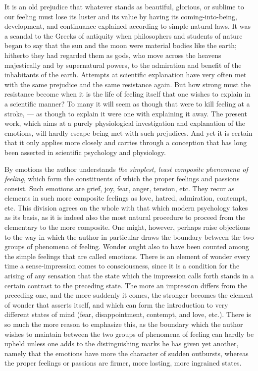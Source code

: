 \documentclass[12pt,a4paper,openany]{book}
\newcommand{\opage}[1]{\marginnote{\footnotesize\textit{[#1]}}}
\begin{document}
It is an old prejudice that whatever stands as beautiful,
glorious, or sublime to our feeling must lose its luster
and its value by having its coming-into-being, development, and
continuance explained according to simple natural laws. It was
a scandal to the Greeks of antiquity when philosophers and
students of nature began to say that the sun and the moon were
material bodies like the earth; hitherto they had regarded
them as gods, who move across the heavens majestically and by
supernatural powers, to the admiration and benefit of the
inhabitants of the earth. Attempts at scientific explanation have very
often met with the same prejudice and the same resistance again.
But how strong must the resistance become when it is
the life of feeling itself that one wishes to explain in a
scientific manner? To many it will seem as though that were to kill
feeling at a stroke, --- as though to explain it were
one with explaining it away. The present work, which
aims at a purely physiological investigation and explanation of
the emotions, will hardly escape being met with such
prejudices. And yet it is certain that it only applies
more closely and carries through a conception that has long been
asserted in scientific psychology and physiology.

By emotions the author understands \emph{the simplest, least
composite phenomena of feeling}, which form the constituents
of which the proper feelings and passions consist.
Such emotions are grief, joy, fear, anger,
tension, etc. They recur as elements in such more
composite feelings as love, hatred, admiration,
\opage{52}contempt, etc. This division agrees on the whole with that
which modern psychology takes as its basis, as it is indeed also
the most natural procedure to proceed from the
elementary to the more composite. One might, however, perhaps raise
objections to the way in which the author in particular
draws the boundary between the two groups of phenomena of feeling.
Wonder ought also to have been counted among the simple feelings that are
called emotions. There is an element of
wonder every time a sense-impression comes to consciousness,
since it is a condition for the arising of any sensation
that the state which the impression calls forth stands in a certain
contrast to the preceding state. The more an impression
differs from the preceding one, and the more suddenly it
comes, the stronger becomes the element of wonder that
asserts itself, and which can form the introduction to very
different states of mind (fear, disappointment, contempt, and
love, etc.). There is so much the more reason to
emphasize this, as the boundary which the author wishes to maintain between the two
groups of phenomena of feeling can hardly be upheld
unless one adds to the distinguishing marks he has given
yet another, namely that the emotions have more the character
of sudden outbursts, whereas the proper feelings or
passions are firmer, more lasting, more ingrained states.
\end{document}
